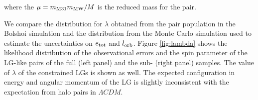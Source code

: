 \documentclass{emulateapj}
\begin{document}
where the $\mu=m_{\rm M31}m_{\rm MW}/M$ is the reduced mass for the pair.


We compare the distribution for  $\lambda$ obtained from the pair population in the Bolshoi simulation and the distribution from the 
Monte Carlo%
simulation used to estimate the uncertainties on $e_{\rm tot}$ and $l_{\rm orb}$. 
Figure \ref{fig:lambda} shows the likelihood distribution of the observational errors and the spin parameter of the LG-like pairs of the full (left panel) and the sub- (right panel) samples.  The value of $\lambda$ of the constrained LGs is shown as well. 
The expected configuration in energy and angular momentum of the LG is slightly inconsistent with the expectation from halo pairs in $\Lambda CDM$. 
\end{document}
